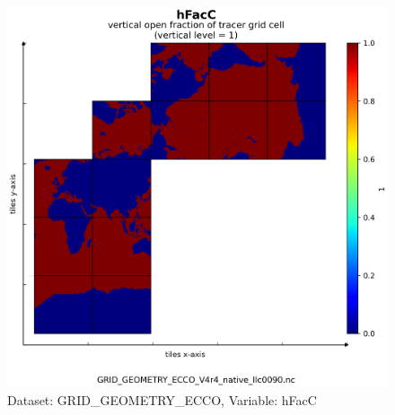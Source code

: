 \begin{figure}[H]
\centering
\includegraphics[scale=0.55]{../images/plots/v4r4/native_plots_coords/Geometry_Parameters_for_the_Lat-Lon-Cap_90_(llc90)_Native_Model_Grid_(Version_4_Release_4)/hFacC.png}
\caption{Dataset: GRID\_GEOMETRY\_ECCO, Variable: hFacC}
\label{tab:table-GRID_GEOMETRY_ECCO_hFacC-Plot}
\end{figure}
\newpage
\pagebreak
